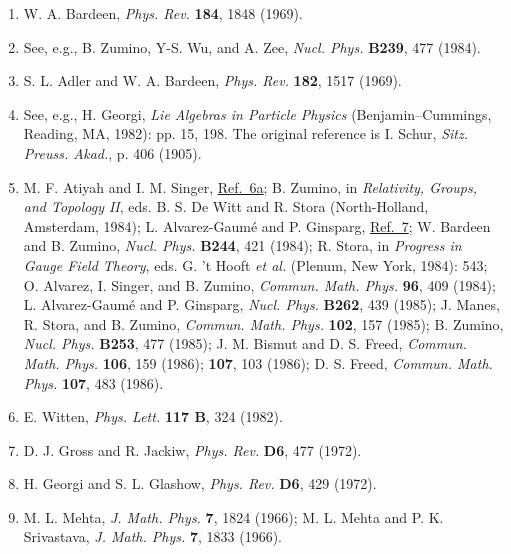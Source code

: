 \begin{enumerate}
\item {}\label{ch22-ref-8}
W. A. Bardeen, \emph{Phys. Rev.} \textbf{184}, 1848 (1969).

\item[8a.] \label{ch22-ref-8a}
See, e.g., B. Zumino, Y-S. Wu, and A. Zee, \emph{Nucl. Phys.}
\textbf{B239}, 477 (1984).

\item {}\label{ch22-ref-9}
S. L. Adler and W. A. Bardeen, \emph{Phys. Rev.} \textbf{182}, 1517
(1969).

\item {}\label{ch22-ref-10}
See, e.g., H. Georgi, \emph{Lie Algebras in Particle Physics}
(Benjamin--Cummings, Reading, MA, 1982): pp. 15, 198. The original
reference is I. Schur, \emph{Sitz. Preuss. Akad.}, p. 406 (1905).

\item[10a.] \label{ch22-ref-10a}
M. F. Atiyah and I. M. Singer, \hyperref[ch22-ref-6a]{Ref.~6a};
B. Zumino, in \emph{Relativity, Groups, and Topology II}, eds.
B. S. De Witt and R. Stora (North-Holland, Amsterdam, 1984);
L. Alvarez-Gaum\'e and P. Ginsparg, \hyperref[ch22-ref-7]{Ref.~7};
W. Bardeen and B. Zumino, \emph{Nucl. Phys.} \textbf{B244}, 421 (1984);
R. Stora, in \emph{Progress in Gauge Field Theory}, eds. G. 't Hooft
\emph{et al.} (Plenum, New York, 1984): 543; O. Alvarez, I. Singer, and
B. Zumino, \emph{Commun. Math. Phys.} \textbf{96}, 409 (1984);
L. Alvarez-Gaum\'e and P. Ginsparg, \emph{Nucl. Phys.} \textbf{B262},
439 (1985); J. Manes, R. Stora, and B. Zumino,
\emph{Commun. Math. Phys.} \textbf{102}, 157 (1985); B. Zumino,
\emph{Nucl. Phys.} \textbf{B253}, 477 (1985); J. M. Bismut and
D. S. Freed, \emph{Commun. Math. Phys.} \textbf{106}, 159 (1986);
\textbf{107}, 103 (1986); D. S. Freed, \emph{Commun. Math. Phys.}
\textbf{107}, 483 (1986).

\item[10b.] \label{ch22-ref-10b}
E. Witten, \emph{Phys. Lett.} \textbf{117 B}, 324 (1982).

\item {}\label{ch22-ref-11}
D. J. Gross and R. Jackiw, \emph{Phys. Rev.} \textbf{D6}, 477 (1972).

\item {}\label{ch22-ref-12}
H. Georgi and S. L. Glashow, \emph{Phys. Rev.} \textbf{D6}, 429 (1972).

\item {}\label{ch22-ref-13}
M. L. Mehta, \emph{J. Math. Phys.} \textbf{7}, 1824 (1966);
M. L. Mehta and P. K. Srivastava, \emph{J. Math. Phys.} \textbf{7},
1833 (1966).


\end{enumerate}
